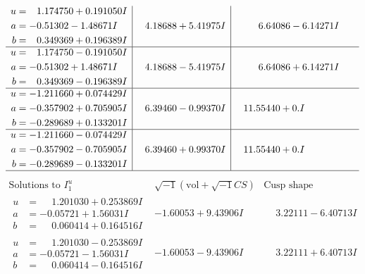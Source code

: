 \documentclass[1p]{elsarticle_modified}
\theoremstyle{definition}
\newcommand{\I}{\sqrt{-1}}
\begin{document}
$$\begin{array}{c|c|c}
\begin{aligned}
u &= \phantom{-}1.174750 + 0.191050 I \\
a &= -0.51302 - 1.48671 I \\
b &= \phantom{-}0.349369 + 0.196389 I\end{aligned}
 & \phantom{-}4.18688 + 5.41975 I & \phantom{-}6.64086 - 6.14271 I \\ \hline\begin{aligned}
u &= \phantom{-}1.174750 - 0.191050 I \\
a &= -0.51302 + 1.48671 I \\
b &= \phantom{-}0.349369 - 0.196389 I\end{aligned}
 & \phantom{-}4.18688 - 5.41975 I & \phantom{-}6.64086 + 6.14271 I \\ \hline\begin{aligned}
u &= -1.211660 + 0.074429 I \\
a &= -0.357902 + 0.705905 I \\
b &= -0.289689 + 0.133201 I\end{aligned}
 & \phantom{-}6.39460 - 0.99370 I & \phantom{-}11.55440 + 0. I\phantom{ +0.000000I} \\ \hline\begin{aligned}
u &= -1.211660 - 0.074429 I \\
a &= -0.357902 - 0.705905 I \\
b &= -0.289689 - 0.133201 I\end{aligned}
 & \phantom{-}6.39460 + 0.99370 I & \phantom{-}11.55440 + 0. I\phantom{ +0.000000I}\\
 \hline 
 \end{array}$$\newpage$$\begin{array}{c|c|c}  
\text{Solutions to }I^u_{1}& \I (\text{vol} + \sqrt{-1}CS) & \text{Cusp shape}\\
 \hline 
\begin{aligned}
u &= \phantom{-}1.201030 + 0.253869 I \\
a &= -0.05721 + 1.56031 I \\
b &= \phantom{-}0.060414 + 0.164516 I\end{aligned}
 & -1.60053 + 9.43906 I & \phantom{-}3.22111 - 6.40713 I \\ \hline\begin{aligned}
u &= \phantom{-}1.201030 - 0.253869 I \\
a &= -0.05721 - 1.56031 I \\
b &= \phantom{-}0.060414 - 0.164516 I\end{aligned}
 & -1.60053 - 9.43906 I & \phantom{-}3.22111 + 6.40713 I \\ \hline\begin{aligned}

\end{aligned}
\end{array}$$
\end{document}
